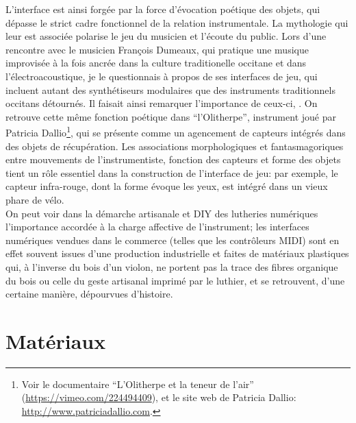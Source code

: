 \indent L'interface est ainsi forgée par la force d'évocation poétique des objets, qui dépasse le strict cadre fonctionnel de la relation instrumentale. La mythologie qui leur est associée polarise le jeu du musicien et l'écoute du public. Lors d'une rencontre avec le musicien François Dumeaux, qui pratique une musique improvisée à la fois ancrée dans la culture traditionelle occitane et dans l'électroacoustique, je le questionnais à propos de ses interfaces de jeu, qui incluent autant des synthétiseurs modulaires que des instruments traditionnels occitans détournés. Il faisait ainsi remarquer l'importance de ceux-ci, . On retrouve cette même fonction poétique dans ``l'Olitherpe'', instrument joué par Patricia Dallio\footnote{Voir le documentaire ``L'Olitherpe et la teneur de l'air'' (\url{https://vimeo.com/224494409}), et le site web de Patricia Dallio: \url{http://www.patriciadallio.com}.}, qui se présente comme un agencement de capteurs intégrés dans des objets de récupération. Les associations morphologiques et fantasmagoriques entre mouvements de l'instrumentiste, fonction des capteurs et forme des objets tient un rôle essentiel dans la construction de l'interface de jeu: par exemple, le capteur infra-rouge, dont la forme évoque les yeux, est intégré dans un vieux phare de vélo.\\
\indent On peut voir dans la démarche artisanale et \gls{DIY} des lutheries numériques l'importance accordée à la charge affective de l'instrument; les interfaces numériques vendues dans le commerce (telles que les contrôleurs \gls{MIDI}) sont en effet souvent issues d'une production industrielle et faites de matériaux plastiques qui, à l'inverse du bois d'un violon, ne portent pas la trace des fibres organique du bois ou celle du geste artisanal imprimé par le luthier, et se retrouvent, d'une certaine manière, dépourvues d'histoire.

\section{Matériaux}
\label{sec:interfaces:materials}

